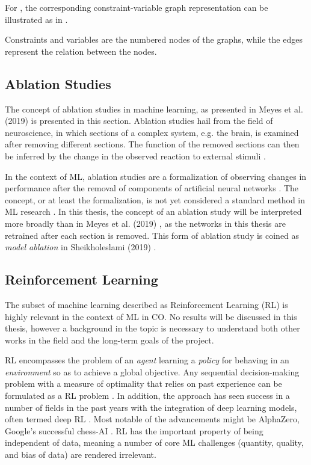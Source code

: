 For , the corresponding constraint-variable graph representation can be illustrated as in
.

Constraints and variables are the numbered nodes of the graphs, while the edges represent the relation between the nodes. 




\subsection{Ablation Studies}

The concept of ablation studies in machine learning, as presented in 
Meyes et al. (2019) \cite{meyes2019ablation} is presented in this section.
Ablation studies hail from the field of neuroscience, in which sections of a complex system, e.g. the brain, is examined after removing different sections. The function of the removed sections can then be inferred by the change in the observed reaction to external stimuli \cite{meyes2019ablation}.

In the context of \gls{ML}, ablation studies are a formalization of observing changes in performance after the removal of components of artificial neural networks \cite{meyes2019ablation}.  
The concept, or at least the formalization, is not yet considered a standard method in \gls{ML} research \cite{sheikholeslami2019ablation}.
In this thesis, the concept of an ablation study will be interpreted more broadly than in Meyes et al. (2019) \cite{meyes2019ablation}, as the networks in this thesis are retrained after each section is removed. This form of ablation study is coined as \textit{model ablation} in Sheikholeslami (2019) \cite{sheikholeslami2019ablation}.





\subsection{Reinforcement Learning}

The subset of machine learning described as Reinforcement Learning (\gls{RL}) is highly relevant in the context of \gls{ML} in \gls{CO}. No results will be discussed in this thesis, however a background in the topic is necessary to understand both other works in the field and the long-term goals of the project.

\gls{RL} encompasses the problem of an \textit{agent} learning a \textit{policy} for behaving in an \textit{environment} so as to achieve a global objective. Any sequential decision-making problem with a measure of optimality that relies on past experience can be formulated as a \gls{RL} problem \cite{francois2018introduction}. In addition, the approach has seen success in a number of fields in the past years with the integration of deep learning models, often termed deep \gls{RL} \cite{francois2018introduction}. Most notable of the advancements might be AlphaZero, Google's successful chess-AI \cite{silver2017mastering}. \gls{RL} has the important property of being independent of data, meaning a number of core \gls{ML} challenges (quantity, quality, and bias of data) are rendered irrelevant. 

